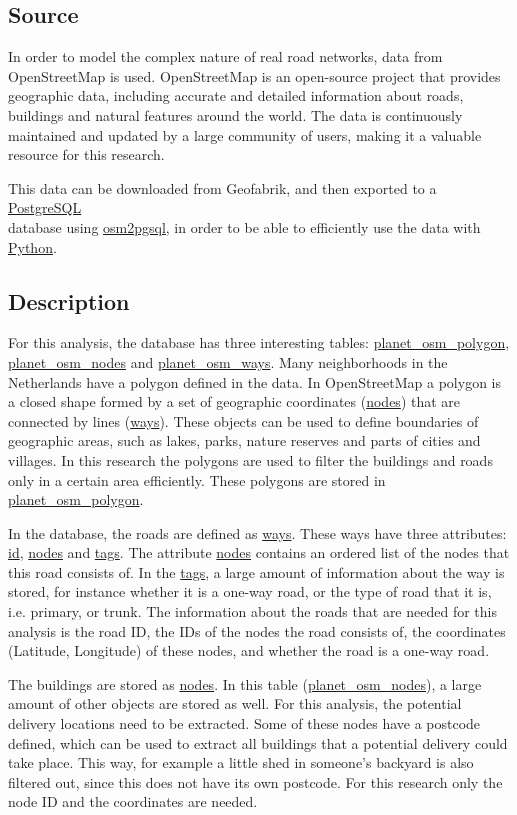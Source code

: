 \subsection{Source}
In order to model the complex nature of real road networks, data from OpenStreetMap \citep{openstreetmap} is used.
OpenStreetMap is an open-source project that provides geographic data, including accurate and
detailed information about roads, buildings and natural features around the world. The data is
continuously maintained and updated by a large community of users, making it a valuable resource
for this research.

This data can be downloaded from Geofabrik, and then exported to a \url{PostgreSQL}\\ 
database using \url{osm2pgsql}, in order to be able to efficiently use the data with \url{Python}.

\subsection{Description}
For this analysis, the database has three interesting tables: \url{planet_osm_polygon},\\
\url{planet_osm_nodes} and \url{planet_osm_ways}.
Many neighborhoods in the Netherlands have a polygon defined in the data.
In OpenStreetMap a polygon is a closed shape formed by a set of geographic coordinates
(\url{nodes}) that are connected by lines (\url{ways}). These objects can be used to define boundaries of
geographic areas, such as lakes, parks, nature reserves and parts of cities and villages. In this
research the polygons are used to filter the buildings and roads only in a certain area efficiently.
These polygons are stored in \url{planet_osm_polygon}.

In the database, the roads are defined as \url{ways}. These ways have three
attributes: \url{id}, \url{nodes} and \url{tags}. The attribute \url{nodes} contains an ordered list
of the nodes that this road consists of. In the \url{tags}, a large amount of
information about the way is stored, for instance whether it is a
one-way road, or the type of road that it is, i.e. primary, or trunk.
The information about the roads that are needed for this analysis is the
road ID, the IDs of the nodes the road consists of, the coordinates
(Latitude, Longitude) of these nodes, and whether the road is a one-way
road.

The buildings are stored as \url{nodes}. In this table (\url{planet_osm_nodes}),
a large amount of other objects are stored as well. For this analysis,
the potential delivery locations need to be extracted. Some of these
nodes have a postcode defined, which can be used to extract all buildings
that a potential delivery could take place. This way, for example a little shed in
someone's backyard is also filtered out, since this does not have its own
postcode. For this research only the node ID and the coordinates are
needed.

